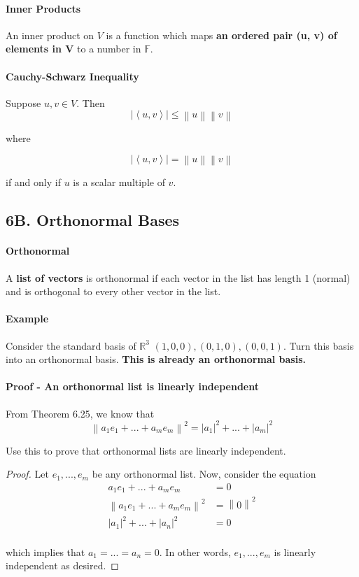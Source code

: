\documentclass{article}
\newcommand{\norm}[1]{\left\lVert#1\right\rVert}
\newcommand{\iprod}[2]{\left\langle#1,#2\right\rangle}
\newcommand{\abs}[1]{\left|#1\right|}
\begin{document}
\paragraph{Inner Products} An inner product on $V$ is a function which maps \textbf{an ordered pair (u, v) of elements in V} to a number in $\mathbb{F}$.

\paragraph{Cauchy-Schwarz Inequality}
Suppose $u, v \in V$. Then
\[
    \abs{\iprod{u}{v}} \leq \norm{u}\norm{v}
\]

where 

\[
    \abs{\iprod{u}{v}} = \norm{u}\norm{v}
\]

if and only if $u$ is a scalar multiple of $v$.

\subsection*{6B. Orthonormal Bases}
\paragraph{Orthonormal} A \textbf{list of vectors} is orthonormal if each vector in the list has length 1 (normal) and is orthogonal to every other vector in the list.

\paragraph{Example} Consider the standard basis of $\mathbb{R}^3$ $(1, 0, 0), (0, 1, 0), (0, 0, 1)$. Turn this basis into an orthonormal basis. \textbf{This is already an orthonormal basis.}

\paragraph{Proof - An orthonormal list is linearly independent} From Theorem 6.25, we know that 
\[ \norm{a_1e_1 + ... + a_me_m}^2 = \abs{a_1}^2 + ... + \abs{a_m}^2 \]

Use this to prove that orthonormal lists are linearly independent.

\begin{proof}
Let $e_1, ..., e_m$ be any orthonormal list. Now, consider the equation
\[\begin{aligned}
a_1e_1 + ... + a_me_m &= 0 \\
\norm{a_1e_1 + ... + a_me_m}^2 &= \norm{0}^2 \\
\abs{a_1}^2 + ... + \abs{a_n}^2 &= 0 \\
\end{aligned}\]

which implies that $a_1 = ... = a_n = 0$. In other words, $e_1, ..., e_m$ is linearly independent as desired.
\end{proof}
\end{document}

